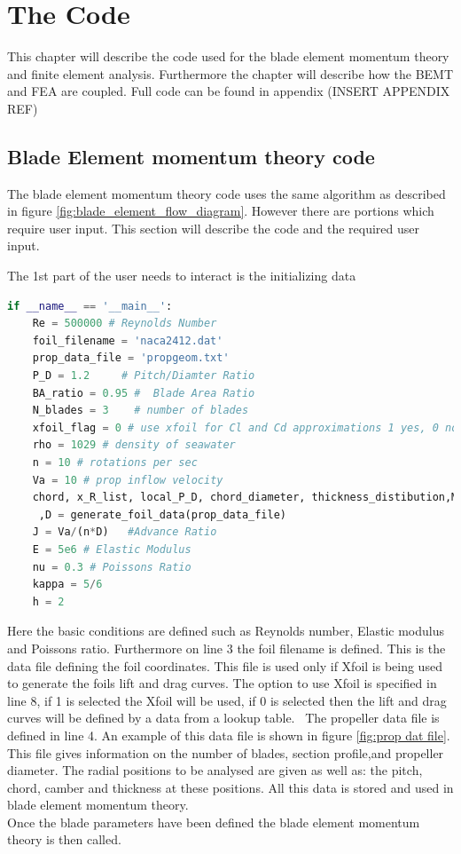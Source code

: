 \documentclass[]{report}
\begin{document}
\chapter{The Code}
\label{ch:code}
This chapter will describe the code used for the blade element momentum theory and finite element analysis. Furthermore the chapter will describe how the BEMT and FEA are coupled. Full code can be found in appendix (INSERT APPENDIX REF)

\section{Blade Element momentum theory code}
The blade element momentum theory code uses the same algorithm as described in figure \ref{fig:blade_element_flow_diagram}. However there are portions which require user input. This section will describe the code and the required user input.

The 1st part of the user needs to interact is the initializing data

\begin{lstlisting}[language = Python]
if __name__ == '__main__':
	Re = 500000 # Reynolds Number
	foil_filename = 'naca2412.dat'
	prop_data_file = 'propgeom.txt'
	P_D = 1.2     # Pitch/Diamter Ratio
	BA_ratio = 0.95 #  Blade Area Ratio
	N_blades = 3    # number of blades
	xfoil_flag = 0 # use xfoil for Cl and Cd approximations 1 yes, 0 no
	rho = 1029 # density of seawater
	n = 10 # rotations per sec
	Va = 10 # prop inflow velocity
	chord, x_R_list, local_P_D, chord_diameter, thickness_distibution,MC,filename \\
	 ,D = generate_foil_data(prop_data_file)
	J = Va/(n*D)   #Advance Ratio
	E = 5e6 # Elastic Modulus
	nu = 0.3 # Poissons Ratio
	kappa = 5/6 
	h = 2 
\end{lstlisting}

Here the basic conditions are defined such as Reynolds number, Elastic modulus and Poissons ratio. Furthermore on line 3 the foil filename is defined. This is the data file defining the foil coordinates. This file is used only if Xfoil is being used to generate the foils lift and drag curves. The option to use Xfoil is specified in line 8, if 1 is selected the Xfoil will be used, if 0 is selected then the lift and drag curves will be defined by a data from a lookup table. \
The propeller data file is defined in line 4. An example of this data file is shown in figure \ref{fig:prop dat file}. This file gives information on the number of blades, section profile,and propeller diameter. The radial positions to be analysed are given as well as: the pitch, chord, camber and thickness at these positions. All this data is stored and used in blade element momentum theory. 
\\
Once the blade parameters have been defined the blade element momentum theory is then called.
\end{document}
